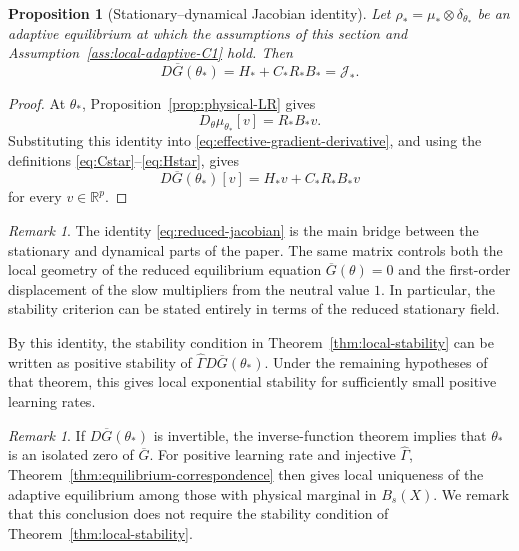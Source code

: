 \documentclass[11pt]{article}
\newtheorem{proposition}[theorem]{Proposition}
\theoremstyle{definition}
\theoremstyle{remark}
\newtheorem{remark}[theorem]{Remark}
\newcommand{\R}{\mathbb{R}}
\newcommand{\Gammahat}{\widehat{\Gamma}}
\begin{document}
{\begin{proposition}[Stationary--dynamical Jacobian identity]
\label{prop:effective-jacobian-identification}
Let \(\rho_*=\mu_*\otimes\delta_{\theta_*}\) be an adaptive equilibrium at
which the assumptions of this section and
Assumption~\ref{ass:local-adaptive-C1} hold.  Then
\begin{equation}
  \boxed{
  D\overline G(\theta_*)
  =H_*+C_*R_*B_*
  =\mathcal J_*.}
  \label{eq:reduced-jacobian}
\end{equation}
\end{proposition}

\begin{proof}
At \(\theta_*\), Proposition~\ref{prop:physical-LR} gives
\[
  D_\theta\mu_{\theta_*}[v]
  =R_*B_*v.
\]
Substituting this identity into
\eqref{eq:effective-gradient-derivative}, and using the definitions
\eqref{eq:Cstar}--\eqref{eq:Hstar}, gives
\[
  D\overline G(\theta_*)[v]
  =H_*v+C_*R_*B_*v
\]
for every \(v\in\R^p\).
\end{proof}

\begin{remark}\label{cor:LR-stability} The identity \eqref{eq:reduced-jacobian} is the main bridge between the
stationary and dynamical parts of the paper.  The same matrix controls both the
local geometry of the reduced equilibrium equation
\(\overline G(\theta)=0\) and the first-order displacement of the slow
multipliers from the neutral value \(1\).  In particular, the stability
criterion can be stated entirely in terms of the reduced stationary field.

By this identity, the stability condition in
Theorem~\ref{thm:local-stability} can be written as
positive stability of $\Gammahat D\overline G(\theta_*)$.
Under the remaining hypotheses of that theorem, this
gives local exponential stability for sufficiently
small positive learning rates.
\end{remark}
\begin{remark}\label{cor:local-uniqueness} If $D\overline G(\theta_*)$ is invertible, the
inverse-function theorem implies that $\theta_*$ is
an isolated zero of $\overline G$.
For positive learning rate and injective $\Gammahat$,
Theorem~\ref{thm:equilibrium-correspondence} then gives
local uniqueness of the adaptive equilibrium among
those with physical marginal in $B_s(X)$.
We remark that this conclusion does not require the stability condition
of Theorem~\ref{thm:local-stability}.
\end{remark}

}
\end{document}
